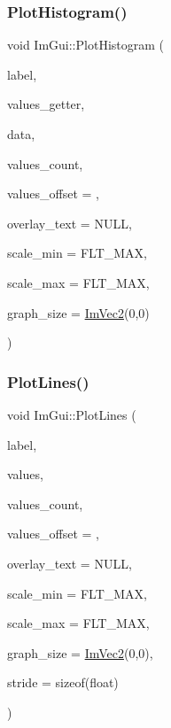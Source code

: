 \hypertarget{namespace_im_gui_af8089203baf8cf723a158c9e34bda2a4}{}\label{namespace_im_gui_af8089203baf8cf723a158c9e34bda2a4} 
\subsubsection{\texorpdfstring{Plot\+Histogram()}{PlotHistogram()}\hspace{0.1cm}{\footnotesize\ttfamily [2/2]}}
{\footnotesize\ttfamily void Im\+Gui\+::\+Plot\+Histogram (\begin{DoxyParamCaption}\item[{const char $\ast$}]{label,  }\item[{float($\ast$)(void $\ast$data, int idx)}]{values\+\_\+getter,  }\item[{void $\ast$}]{data,  }\item[{int}]{values\+\_\+count,  }\item[{int}]{values\+\_\+offset = {},  }\item[{const char $\ast$}]{overlay\+\_\+text = {\ttfamily NULL},  }\item[{float}]{scale\+\_\+min = {\ttfamily FLT\+\_\+MAX},  }\item[{float}]{scale\+\_\+max = {\ttfamily FLT\+\_\+MAX},  }\item[{\hyperlink{struct_im_vec2}{Im\+Vec2}}]{graph\+\_\+size = {\ttfamily \hyperlink{struct_im_vec2}{Im\+Vec2}(0,0)} }\end{DoxyParamCaption})}

\hypertarget{namespace_im_gui_a2bc21c56e4796855313804086cca114f}{}\label{namespace_im_gui_a2bc21c56e4796855313804086cca114f} 
\subsubsection{\texorpdfstring{Plot\+Lines()}{PlotLines()}\hspace{0.1cm}{\footnotesize\ttfamily [1/2]}}
{\footnotesize\ttfamily void Im\+Gui\+::\+Plot\+Lines (\begin{DoxyParamCaption}\item[{const char $\ast$}]{label,  }\item[{const float $\ast$}]{values,  }\item[{int}]{values\+\_\+count,  }\item[{int}]{values\+\_\+offset = {},  }\item[{const char $\ast$}]{overlay\+\_\+text = {\ttfamily NULL},  }\item[{float}]{scale\+\_\+min = {\ttfamily FLT\+\_\+MAX},  }\item[{float}]{scale\+\_\+max = {\ttfamily FLT\+\_\+MAX},  }\item[{\hyperlink{struct_im_vec2}{Im\+Vec2}}]{graph\+\_\+size = {\ttfamily \hyperlink{struct_im_vec2}{Im\+Vec2}(0,0)},  }\item[{int}]{stride = {\ttfamily sizeof(float)} }\end{DoxyParamCaption})}

